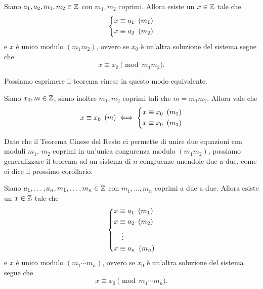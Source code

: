 \begin{theorem}
     \label{th_cinese}
    Siano $a_1, a_2, m_1, m_2 \in \mathbb{Z}$ con $m_1, m_2$ coprimi. Allora esiste un $x \in \mathbb{Z}$ tale che
    \begin{equation*}
        \left\{
        \begin{alignedat}{1}
            x&\equiv a_1 \ \left(m_1\right)\\
            x&\equiv a_2 \ \left(m_2\right)
        \end{alignedat}      
        \right . 
    \end{equation*}
    e $x$ è unico modulo $(m_1m_2)$, ovvero se $x_0$ è un'altra soluzione del sistema segue che
    \begin{equation}
        x \equiv x_0 \pmod{m_1 m_2}.
    \end{equation} 
\end{theorem}

Possiamo esprimere il teorema cinese in questo modo equivalente.

\begin{theorem}
     \label{th_cinese_2}
    Siano $x_0, m \in \mathbb{Z}$; siano inoltre $m_1, m_2$ coprimi tali che $m = m_1m_2$. Allora vale che \begin{equation}
        x \equiv x_0 \ \left(m\right) \iff \left\{
            \begin{alignedat}{1}
                x&\equiv x_0 \ \left(m_1\right)\\
                x&\equiv x_0 \ \left(m_2\right)
            \end{alignedat}      
            \right .
    \end{equation}
\end{theorem}

Dato che il Teorema Cinese del Resto ci permette di unire due equazioni con moduli $m_1$, $m_2$ coprimi in un'unica congurenza modulo $(m_1m_2)$, possiamo generalizzare il teorema ad un sistema di $n$ congruenze unendole due a due, come ci dice il prossimo corollario.

\begin{corollary}
    \label{th_cinese_n}
    Siano $a_1, \dots, a_n, m_1, \dots, m_n \in \mathbb{Z}$ con $m_1, \dots, m_n$ coprimi a due a due. Allora esiste un $x \in \mathbb{Z}$ tale che
    \begin{equation*}
        \left\{
        \begin{alignedat}{1}
            x&\equiv a_1 \Mod{m_1}\\
            x&\equiv a_2 \Mod{m_2}\\
            &\vdotswithin{\equiv}\\
            x&\equiv a_n \Mod{m_n}
        \end{alignedat}      
        \right . 
    \end{equation*}
    e $x$ è unico modulo $(m_1\cdots m_n)$, ovvero se $x_0$ è un'altra soluzione del sistema segue che
    \begin{equation}
        x \equiv x_0 \pmod{m_1 \cdots m_n}.
    \end{equation} 
\end{corollary}

